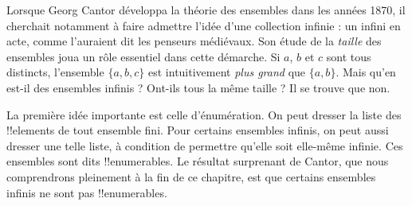 \documentclass[../../../include/open-logic-section]{subfiles}
\begin{document}


Lorsque Georg Cantor développa la théorie des ensembles dans les années
1870, il cherchait notamment à faire admettre l’idée d’une collection
infinie : un infini en acte, comme l’auraient dit les penseurs médiévaux.
Son étude de la \emph{taille} des ensembles joua un rôle essentiel
dans cette démarche. Si $a$, $b$ et $c$ sont tous distincts, l’ensemble
$\{a, b, c\}$ est intuitivement \emph{plus grand} que $\{a, b\}$.
Mais qu’en est-il des ensembles infinis ? Ont-ils tous la même taille ?
Il se trouve que non.

La première idée importante est celle d’énumération. On peut dresser
la liste des !!{element}s de tout ensemble fini. Pour certains ensembles
infinis, on peut aussi dresser une telle liste, à condition de permettre
qu’elle soit elle-même infinie. Ces ensembles sont dits !!{enumerable}s.
Le résultat surprenant de Cantor, que nous comprendrons pleinement
à la fin de ce chapitre, est que certains ensembles infinis ne sont pas
!!{enumerable}s.
\end{document}
